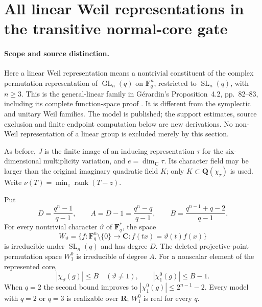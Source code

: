 \section{All linear Weil representations in the transitive normal-core gate}
\label{sec:linear-weil-core}

\paragraph{Scope and source distinction.}
Here a linear Weil representation means a nontrivial constituent of the
complex permutation representation of $\operatorname{GL}_n(q)$ on
$\mathbf F_q^n$, restricted to $\operatorname{SL}_n(q)$, with $n\ge3$.
This is the general-linear family in G\'erardin's Proposition~4.2,
pp.~82--83, including its complete function-space proof
\cite{BI:GerardinLinear}. It is different from the symplectic and
unitary Weil families. The model is published; the support estimates,
source exclusion and finite endpoint computation below are new
derivations. No non-Weil representation of a linear group is excluded
merely by this section.

As before, $J$ is the finite image of an inducing representation
$\tau$ for the six-dimensional multiplicity variation, and
$e=\dim_{\mathbf C}\tau$. Its character field may be larger than the
original imaginary quadratic field $K$; only
$K\subset\mathbf Q(\chi_\tau)$ is used. Write
$\nu(T)=\min_z\operatorname{rank}(T-z)$.

\begin{lemma}
\label{D-BI-23a}
Put
\[
 D=\frac{q^n-1}{q-1},\qquad
 A=D-1=\frac{q^n-q}{q-1},\qquad
 B=\frac{q^{n-1}+q-2}{q-1}.
                                                               \tag{LW.1}
\]
For every nontrivial character $\vartheta$ of $\mathbf F_q^*$,
the space
\[
 W_\vartheta=\{f:\mathbf F_q^n\setminus\{0\}\longrightarrow\mathbf C:
                f(tx)=\vartheta(t)f(x)\}
                                                               \tag{LW.2}
\]
is irreducible under $\operatorname{SL}_n(q)$ and has degree $D$.
The deleted projective-point permutation space $W_1^0$ is irreducible
of degree $A$. For a nonscalar element of the represented core,
\[
 |\chi_\vartheta(g)|\le B\quad(\vartheta\ne1),\qquad
 |\chi_1^0(g)|\le B-1.                                       \tag{LW.3}
\]
When $q=2$ the second bound improves to
$|\chi_1^0(g)|\le2^{n-1}-2$.
Every model with $q=2$ or $q=3$ is realizable over $\mathbf R$;
$W_1^0$ is real for every $q$.
\end{lemma}

